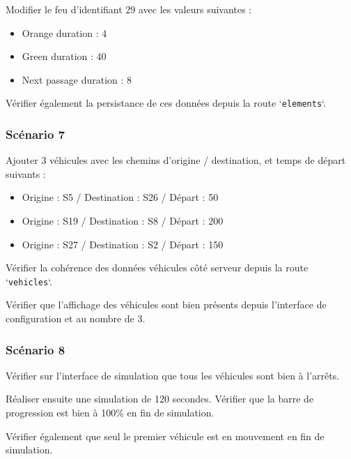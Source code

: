 \documentclass[11pt,a4paper,oneside]{article}
\begin{document}
Modifier le feu d'identifiant 29 avec les valeurs suivantes :
\begin{itemize}
	\item Orange duration : 4
	\item Green duration : 40
	\item Next passage duration : 8
\end{itemize}

\vspace{2mm}
Vérifier également la persistance de ces données depuis la route `\texttt{elements}`.

\subsubsection{Scénario 7}

Ajouter 3 véhicules avec les chemins d'origine / destination, et temps de départ suivants :

\begin{itemize}
	\item Origine : S5 / Destination : S26 / Départ : 50
	\item Origine : S19 / Destination : S8 / Départ : 200
	\item Origine : S27 / Destination : S2 / Départ : 150
\end{itemize}

\vspace{2mm}
Vérifier la cohérence des données véhicules côté serveur depuis la route `\texttt{vehicles}`.

\vspace{2mm}
Vérifier que l'affichage des véhicules sont bien présents depuis l'interface de configuration et au nombre de 3.

\subsubsection{Scénario 8}

\vspace{2mm}
Vérifier sur l'interface de simulation que tous les véhicules sont bien à l'arrêts.

\vspace{2mm}
Réaliser ensuite une simulation de 120 secondes. Vérifier que la barre de progression est bien à 100\% en fin de simulation.

\vspace{2mm}
Vérifier également que seul le premier véhicule est en mouvement en fin de simulation.
\end{document}
